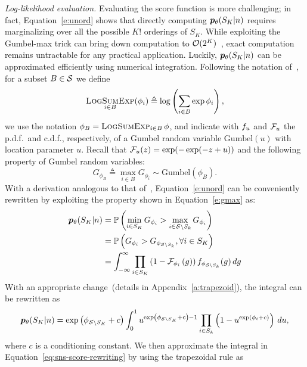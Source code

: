 \textit{Log-likelihood evaluation.}
Evaluating the score function is more challenging; in fact, Equation~\eqref{e:unord} shows that directly computing ${{\bm{p}}_\theta}(S_K|n)$ requires marginalizing over all the possible $K!$ orderings of $S_K$. While exploiting the Gumbel-max trick can bring down computation to $\mathcal{O}(2^K)$~\citep{huijben2022review, kool2020estimating}, exact computation remains untractable for any practical application. Luckily, ${{\bm{p}}_\theta}(S_K|n)$ can be approximated efficiently using numerical integration. Following the notation of~\citet{kool2019stochastic, kool2020estimating}, for a subset $B\in\mathcal{S}$ we define 
\begin{equation}\label{e:logsumexp}
\operatorname*{\textsc{LogSumExp}}_{i\in B} (\phi_i) \triangleq \log \left(\sum_{i\in B}\exp\phi_i \right),
\end{equation}
we use the notation $\phi_B = \operatorname*{\textsc{LogSumExp}}_{i\in B} \phi$, and indicate with $f_u$ and $\mathcal{F}_u$ the p.d.f.\ and c.d.f., respectively, of a Gumbel random variable $\text{Gumbel}(u)$ with location parameter $u$. Recall that $\mathcal{F}_u(z) = \exp(-\exp(-z + u))$ and the following property of Gumbel random variables:
\begin{equation}\label{e:gmax}
    G_{\phi_B} \triangleq \max_{i\in B} G_{\phi_i} \sim \text{Gumbel}(\phi_B).
\end{equation}
With a derivation analogous to that of~\citet{kool2020estimating}, Equation~\eqref{e:unord} can be conveniently rewritten by exploiting the property shown in Equation~\eqref{e:gmax} as:
\begin{align}
    {{\bm{p}}_\theta}(S_K|n) &= \mathbb{P}\left(\min_{i\in S_K} G_{\phi_i} > \max_{i\in {\mathcal{S}\setminus S_k}} G_{\phi_i}\right)\\
    &= \mathbb{P}\left(G_{\phi_i} > G_{\phi_{\mathcal{S} \setminus S_k}}, \forall i \in S_K\right)\\
    &= \int_{-\infty}^{\infty} \prod_{i\in S_K}\left(1 - \mathcal{F}_{\phi_i}\left(g\right)\right)f_{\phi_{\mathcal{S} \setminus S_k}}(g) \,d g
\end{align}
With an appropriate change~(details in Appendix~\ref{a:trapezoid}), the integral can be rewritten as 
\begin{equation}\label{eq:sns-score-rewriting}
    {{\bm{p}}_\theta}(S_K|n) = \exp\left( \phi_{\mathcal{S} \setminus S_K} + c\right)\int_0^1 u^{\exp\left(\phi_{\mathcal{S} \setminus S_K} + c\right) - 1}\prod_{i\in S_k}\left(1 - u^{\exp(\phi_i + c)}\right)\,du,
\end{equation}
where $c$ is a conditioning constant. We then approximate the integral in Equation~\eqref{eq:sns-score-rewriting}  by using the trapezoidal rule as 
